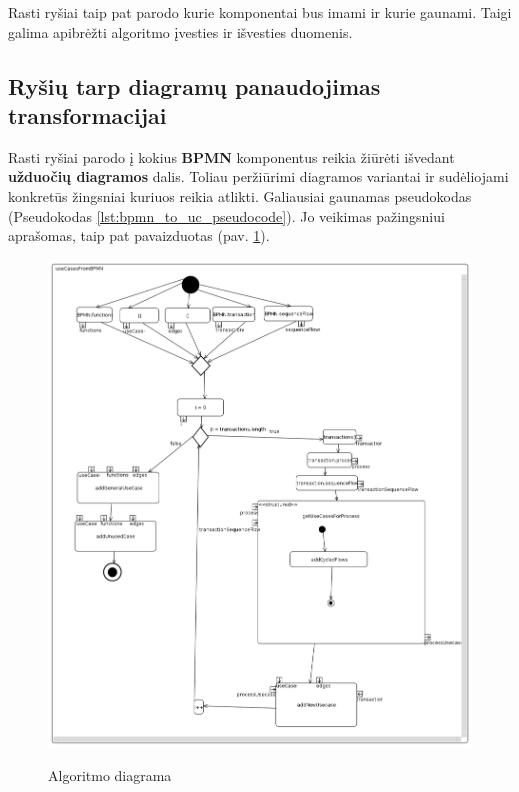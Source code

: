 \documentclass{VUMIFInfBakalaurinis}
\begin{document}
Rasti ryšiai taip pat parodo kurie komponentai bus imami ir kurie gaunami. Taigi galima apibrėžti algoritmo įvesties ir išvesties duomenis.


\subsection{Ryšių tarp diagramų panaudojimas transformacijai}

Rasti ryšiai parodo į kokius \textbf{BPMN} komponentus reikia žiūrėti išvedant \textbf{užduočių diagramos} dalis. Toliau peržiūrimi diagramos variantai ir sudėliojami konkretūs žingsniai kuriuos reikia atlikti. Galiausiai gaunamas pseudokodas (Pseudokodas \ref{lst:bpmn_to_uc_pseudocode}). Jo veikimas pažingsniui aprašomas, taip pat pavaizduotas (pav. \ref{img:algorythm_activity_diagram}).

\begin{figure}[H]
	\centering
	\caption{Algoritmo diagrama}
	\includegraphics[scale=0.5]{img/algorythm-activity-diagram}
	\label{img:algorythm_activity_diagram}
\end{figure} 
\end{document}
